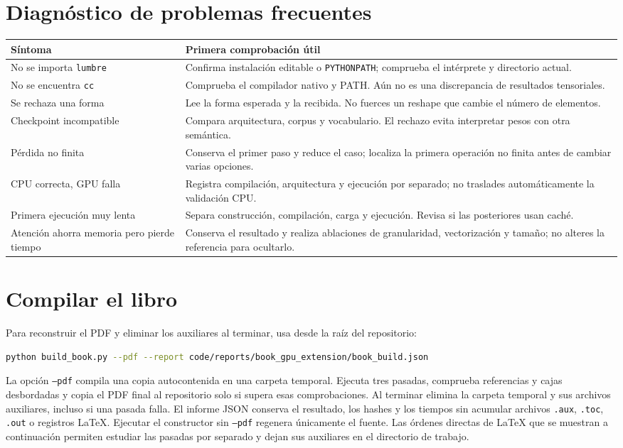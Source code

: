 \section{Diagnóstico de problemas frecuentes}
\begin{longtable}{@{}P{.3\textwidth}P{.64\textwidth}@{}}
\toprule\textbf{Síntoma} & \textbf{Primera comprobación útil}\\\midrule\endhead
No se importa \texttt{lumbre} & Confirma instalación editable o \texttt{PYTHONPATH}; comprueba el intérprete y directorio actual.\\
No se encuentra \texttt{cc} & Comprueba el compilador nativo y PATH. Aún no es una discrepancia de resultados tensoriales.\\
Se rechaza una forma & Lee la forma esperada y la recibida. No fuerces un reshape que cambie el número de elementos.\\
Checkpoint incompatible & Compara arquitectura, corpus y vocabulario. El rechazo evita interpretar pesos con otra semántica.\\
Pérdida no finita & Conserva el primer paso y reduce el caso; localiza la primera operación no finita antes de cambiar varias opciones.\\
CPU correcta, GPU falla & Registra compilación, arquitectura y ejecución por separado; no traslades automáticamente la validación CPU.\\
Primera ejecución muy lenta & Separa construcción, compilación, carga y ejecución. Revisa si las posteriores usan caché.\\
Atención ahorra memoria pero pierde tiempo & Conserva el resultado y realiza ablaciones de granularidad, vectorización y tamaño; no alteres la referencia para ocultarlo.\\
\bottomrule\end{longtable}

\section{Compilar el libro}
Para reconstruir el PDF y eliminar los auxiliares al terminar, usa desde la raíz del repositorio:

\begin{lstlisting}[language=bash]
python build_book.py --pdf --report code/reports/book_gpu_extension/book_build.json
\end{lstlisting}

La opción \texttt{--pdf} compila una copia autocontenida en una carpeta temporal. Ejecuta tres pasadas, comprueba referencias y cajas desbordadas y copia el PDF final al repositorio solo si supera esas comprobaciones. Al terminar elimina la carpeta temporal y sus archivos auxiliares, incluso si una pasada falla. El informe JSON conserva el resultado, los hashes y los tiempos sin acumular archivos \texttt{.aux}, \texttt{.toc}, \texttt{.out} o registros LaTeX. Ejecutar el constructor sin \texttt{--pdf} regenera únicamente el fuente. Las órdenes directas de LaTeX que se muestran a continuación permiten estudiar las pasadas por separado y dejan sus auxiliares en el directorio de trabajo.

